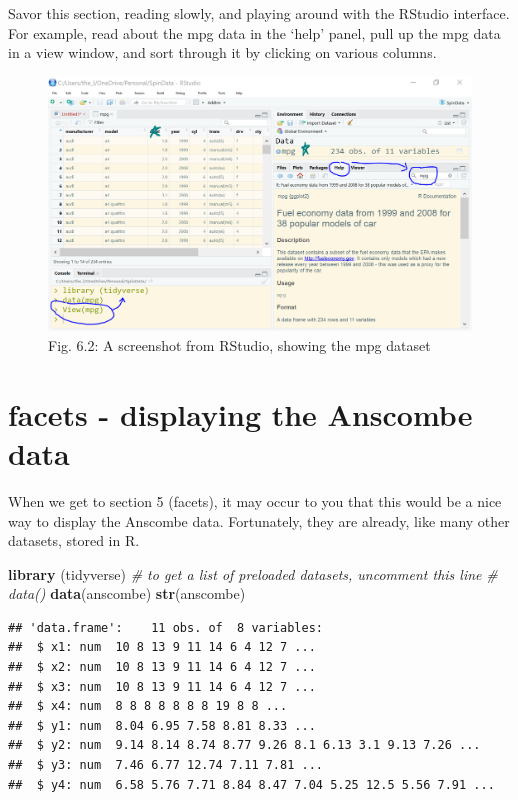 \documentclass[
  openany]{book}
\newenvironment{Shaded}{\begin{snugshade}}{\end{snugshade}}
\newcommand{\CommentTok}[1]{\textcolor[rgb]{0.56,0.35,0.01}{\textit{#1}}}
\newcommand{\KeywordTok}[1]{\textcolor[rgb]{0.13,0.29,0.53}{\textbf{#1}}}
\newcommand{\NormalTok}[1]{#1}
\begin{document}
Savor this section, reading slowly, and playing around with the RStudio interface. For example, read about the mpg data in the `help' panel, pull up the mpg data in a view window, and sort through it by clicking on various columns.

\begin{figure}
\centering
\includegraphics{rstudio62.PNG}
\caption{Fig. 6.2: A screenshot from RStudio, showing the mpg dataset}
\end{figure}

\hypertarget{facets---displaying-the-anscombe-data}{%
\section{facets - displaying the Anscombe data}\label{facets---displaying-the-anscombe-data}}

When we get to section 5 (facets), it may occur to you that this would be a nice way to display the Anscombe data. Fortunately, they are already, like many other datasets, stored in R.

\begin{Shaded}
\begin{Highlighting}[]
\KeywordTok{library}\NormalTok{ (tidyverse)}
\CommentTok{# to get a list of preloaded datasets, uncomment this line}
\CommentTok{# data()}
\KeywordTok{data}\NormalTok{(anscombe)}
\KeywordTok{str}\NormalTok{(anscombe)}
\end{Highlighting}
\end{Shaded}

\begin{verbatim}
## 'data.frame':    11 obs. of  8 variables:
##  $ x1: num  10 8 13 9 11 14 6 4 12 7 ...
##  $ x2: num  10 8 13 9 11 14 6 4 12 7 ...
##  $ x3: num  10 8 13 9 11 14 6 4 12 7 ...
##  $ x4: num  8 8 8 8 8 8 8 19 8 8 ...
##  $ y1: num  8.04 6.95 7.58 8.81 8.33 ...
##  $ y2: num  9.14 8.14 8.74 8.77 9.26 8.1 6.13 3.1 9.13 7.26 ...
##  $ y3: num  7.46 6.77 12.74 7.11 7.81 ...
##  $ y4: num  6.58 5.76 7.71 8.84 8.47 7.04 5.25 12.5 5.56 7.91 ...
\end{verbatim}
\end{document}
